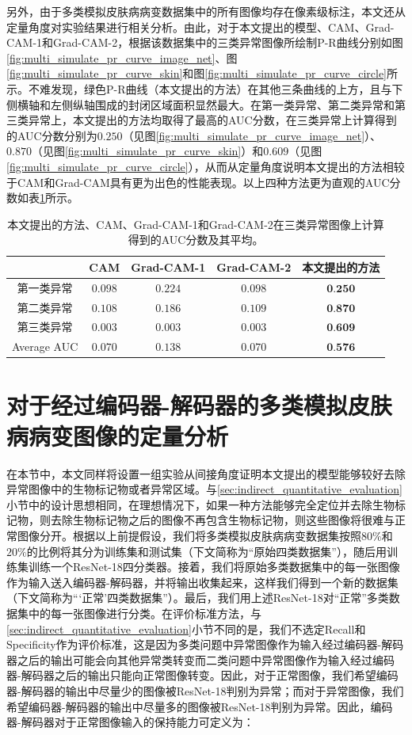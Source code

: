 另外，由于多类模拟皮肤病病变数据集中的所有图像均存在像素级标注，本文还从定量角度对实验结果进行相关分析。由此，对于本文提出的模型、CAM、Grad-CAM-1和Grad-CAM-2，根据该数据集中的三类异常图像所绘制P-R曲线分别如图\ref{fig:multi_simulate_pr_curve_image_net}、图\ref{fig:multi_simulate_pr_curve_skin}和图\ref{fig:multi_simulate_pr_curve_circle}所示。不难发现，绿色P-R曲线（本文提出的方法）在其他三条曲线的上方，且与下侧横轴和左侧纵轴围成的封闭区域面积显然最大。在第一类异常、第二类异常和第三类异常上，本文提出的方法均取得了最高的AUC分数，在三类异常上计算得到的AUC分数分别为$0.250$（见图\ref{fig:multi_simulate_pr_curve_image_net}）、$0.870$（见图\ref{fig:multi_simulate_pr_curve_skin}）和$0.609$（见图\ref{fig:multi_simulate_pr_curve_circle}），从而从定量角度说明本文提出的方法相较于CAM和Grad-CAM具有更为出色的性能表现。以上四种方法更为直观的AUC分数如表\ref{tab:multi_ds_auc_scores}所示。


\begin{table}[!htbp]
	\centering
	\caption{本文提出的方法、CAM、Grad-CAM-1和Grad-CAM-2在三类异常图像上计算得到的AUC分数及其平均。}
	\label{tab:multi_ds_auc_scores}
	\begin{tabular}{c|c|c|c|c}
		\toprule[2pt]
		& CAM & Grad-CAM-1 & Grad-CAM-2 & 本文提出的方法 \\
		\midrule[2pt]
		第一类异常&$0.098$ & $0.224$ &  $0.098$ & $\textbf{0.250}$ \\ \hline
		第二类异常&  $0.108$ &$0.186$ & $0.109$ & $\textbf{0.870}$ \\ \hline
		第三类异常 & $0.003$ & $0.003$ & $0.003$ & $\textbf{0.609}$ \\ \hline
		Average AUC & $0.070$ & $0.138$ & $0.070$ & $\textbf{0.576}$ \\ 
		\bottomrule[2pt]
	\end{tabular}
\end{table}

\section{对于经过编码器-解码器的多类模拟皮肤病病变图像的定量分析}
在本节中，本文同样将设置一组实验从间接角度证明本文提出的模型能够较好去除异常图像中的生物标记物或者异常区域。与\ref{sec:indirect_quantitative_evaluation}小节中的设计思想相同，在理想情况下，如果一种方法能够完全定位并去除生物标记物，则去除生物标记物之后的图像不再包含生物标记物，则这些图像将很难与正常图像分开。根据以上前提假设，我们将多类模拟皮肤病病变数据集按照$80\%$和$20\%$的比例将其分为训练集和测试集（下文简称为“原始四类数据集”），随后用训练集训练一个ResNet-18四分类器。接着，我们将原始多类数据集中的每一张图像作为输入送入编码器-解码器，并将输出收集起来，这样我们得到一个新的数据集（下文简称为“‘正常’四类数据集”）。最后，我们用上述ResNet-18对“正常”多类数据集中的每一张图像进行分类。在评价标准方法，与\ref{sec:indirect_quantitative_evaluation}小节不同的是，我们不选定Recall和Specificity作为评价标准，这是因为多类问题中异常图像作为输入经过编码器-解码器之后的输出可能会向其他异常类转变而二类问题中异常图像作为输入经过编码器-解码器之后的输出只能向正常图像转变。因此，对于正常图像，我们希望编码器-解码器的输出中尽量少的图像被ResNet-18判别为异常；而对于异常图像，我们希望编码器-解码器的输出中尽量多的图像被ResNet-18判别为异常。因此，编码器-解码器对于正常图像输入的保持能力可定义为：

